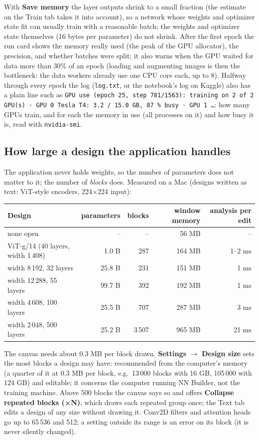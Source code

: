 \documentclass[11pt,a4paper]{article}
\newcommand{\ui}[1]{\textbf{\textsf{#1}}}
\newcommand{\file}[1]{\texttt{#1}}
\begin{document}
With \ui{Save memory} the layer outputs shrink to a small fraction (the estimate on the Train tab takes it into account), so a network
whose weights and optimizer state fit can usually train with a reasonable batch; the weights and optimizer state themselves (16 bytes per
parameter) do not shrink. After the first epoch the run card shows the memory really used (the peak of the GPU allocator), the precision,
and whether batches were split; it also warns when the GPU waited for data more than 30\% of an epoch (loading and augmenting images is
then the bottleneck: the data workers already use one CPU core each, up to 8).
Halfway through every epoch the log (\file{log.txt}, or the notebook's log on Kaggle) also has a plain line such as
\texttt{GPU use (epoch 25, step 781/1563): training on 2 of 2 GPU(s) · GPU 0 Tesla T4: 3.2 / 15.0 GB, 87 \% busy · GPU 1 \ldots}:
how many GPUs train, and for each the memory in use (all processes on it) and how busy it is, read with \texttt{nvidia-smi}.

\subsection{How large a design the application handles}
The application never holds weights, so the number of parameters does not matter to it; the number of \emph{blocks} does. Measured on a
Mac (designs written as text: ViT-style encoders, 224$\times$224 input):

\begin{center}\small
\begin{tabular}{@{}lrrrr@{}}
\toprule
Design & parameters & blocks & window memory & analysis per edit\\
\midrule
none open & -- & -- & 56 MB & --\\
ViT-g/14 (40 layers, width 1\,408) & 1.0 B & 287 & 164 MB & 1--2 ms\\
width 8\,192, 32 layers & 25.8 B & 231 & 151 MB & 1 ms\\
width 12\,288, 55 layers & 99.7 B & 392 & 192 MB & 1 ms\\
width 4\,608, 100 layers & 25.5 B & 707 & 287 MB & 3 ms\\
width 2\,048, 500 layers & 25.2 B & 3\,507 & 965 MB & 21 ms\\
\bottomrule
\end{tabular}
\end{center}
The canvas needs about 0.3 MB per block drawn. \ui{Settings} $\rightarrow$ \ui{Design size} sets the most blocks a design may
have: recommended from the computer's memory (a quarter of it at 0.3 MB per block, e.g.\ 13\,000 blocks with 16 GB, 105\,000 with
124 GB) and editable; it concerns the computer running NN Builder, not the training machine. Above 500 blocks the canvas says so and offers \ui{Collapse repeated blocks (×N)}, which
draws each repeated group once; the Text tab edits a design of any size without drawing it. Conv2D filters and attention heads go up to
65\,536 and 512; a setting outside its range is an error on its block (it is never silently changed).
\end{document}
